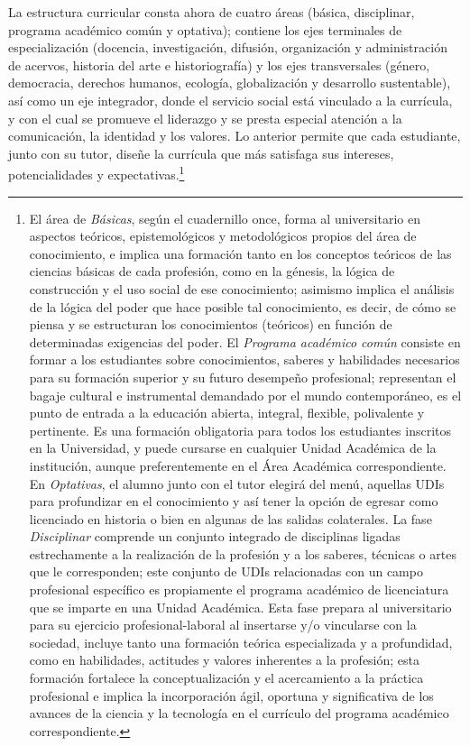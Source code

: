 \enlargethispage{1\baselineskip}
La estructura curricular consta ahora de cuatro áreas (básica, 
disciplinar, programa académico común y optativa); contiene los ejes terminales de 
especialización (docencia, investigación, difusión, organización y 
administración de acervos, historia del arte e historiografía) y los ejes 
transversales (género, democracia, derechos humanos, ecología, 
globalización y desarrollo sustentable), así como un eje integrador, donde el 
servicio social está vinculado a la currícula, y con el cual se promueve el liderazgo 
y se presta especial atención a la comunicación, la identidad y los 
valores. Lo anterior permite que cada estudiante, junto con su tutor, 
diseñe la currícula que más satisfaga sus intereses, potencialidades y 
expectativas.\footnote{El área de \textit{Básicas}, según el cuadernillo once, 
forma al universitario en aspectos teóricos, epistemológicos y 
metodológicos propios del área de conocimiento, e implica una formación 
tanto en los conceptos teóricos de las ciencias básicas de cada 
profesión, como en la génesis, la lógica de construcción y el uso 
social de ese conocimiento; asimismo implica el análisis de la lógica 
del poder que hace posible tal conocimiento, es decir, de cómo se piensa 
y se estructuran los conocimientos (teóricos) en función de 
determinadas exigencias del poder. El \textit{Programa académico común} consiste 
en formar a los estudiantes sobre conocimientos, saberes y habilidades 
necesarios para su formación superior y su futuro desempeño 
profesional; representan el bagaje cultural e instrumental demandado 
por el mundo contemporáneo, es el punto de entrada a la educación 
abierta, integral, flexible, polivalente y pertinente. Es una formación 
obligatoria para todos los estudiantes inscritos en la Universidad, y 
puede cursarse en cualquier Unidad Académica de la institución, aunque 
preferentemente en el Área Académica correspondiente. En \textit{Optativas}, 
el alumno junto con el tutor elegirá del menú, aquellas UDIs para 
profundizar en el conocimiento y así tener la opción de egresar como 
licenciado en historia o bien en algunas de las salidas colaterales.  
La fase \textit{Disciplinar} comprende un conjunto integrado de disciplinas 
ligadas estrechamente a la realización de la profesión y a los saberes, 
técnicas o artes que le corresponden; este conjunto de UDIs 
relacionadas con un campo profesional específico es propiamente el 
programa académico de licenciatura que se imparte en una Unidad 
Académica. Esta fase prepara al universitario para su ejercicio 
profesional-laboral al insertarse y\slash{}o vincularse con la sociedad, 
incluye tanto una formación teórica especializada y a profundidad, como 
en habilidades, actitudes y valores inherentes a la profesión; esta 
formación fortalece la conceptualización y el acercamiento a la 
práctica profesional e implica la incorporación ágil, oportuna y 
significativa de los avances de la ciencia y la tecnología en el 
currículo del programa académico correspondiente.}  

